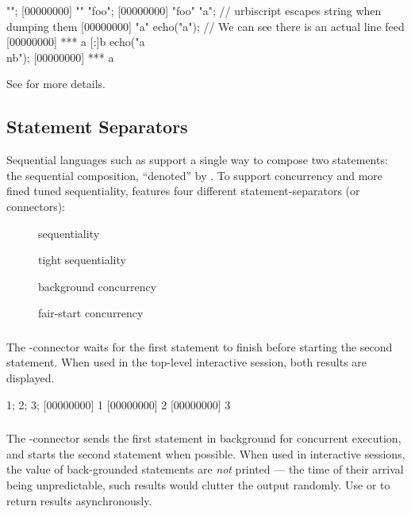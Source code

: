 \begin{urbiscript}[firstnumber=last]
"";
[00000000] ""
"foo";
[00000000] "foo"
"a\nb"; // urbiscript escapes string when dumping them
[00000000] "a\nb"
echo("a\nb"); // We can see there is an actual line feed
[00000000] *** a
[:]b
echo("a\\nb");
[00000000] *** a\nb
\end{urbiscript}

See  for more details.

\subsection{Statement Separators}
\label{sec:lang:separators}

Sequential languages such as \Cxx support a single way to compose two
statements: the sequential composition, ``denoted'' by \samp{;}.  To
support concurrency and more fined tuned sequentiality, \us features
four different statement-separators (or connectors):
\begin{description}
\item[\samp{;}] sequentiality
\item[\samp{|}] tight sequentiality
\item[\samp{,}] background concurrency
\item[\samp{\&}] fair-start concurrency
\end{description}

\subsubsection{\samp{;}}

The \samp{;}-connector waits for the first statement to finish before
starting the second statement.  When used in the top-level interactive
session, both results are displayed.

\begin{urbiscript}[firstnumber=last]
1; 2; 3;
[00000000] 1
[00000000] 2
[00000000] 3
\end{urbiscript}

\subsubsection{\samp{,}}

The \samp{,}-connector sends the first statement in background for
concurrent execution, and starts the second statement when possible.
When used in interactive sessions, the value of back-grounded
statements are \emph{not} printed --- the time of their arrival being
unpredictable, such results would clutter the output randomly.  Use
 or  to return results
asynchronously.

